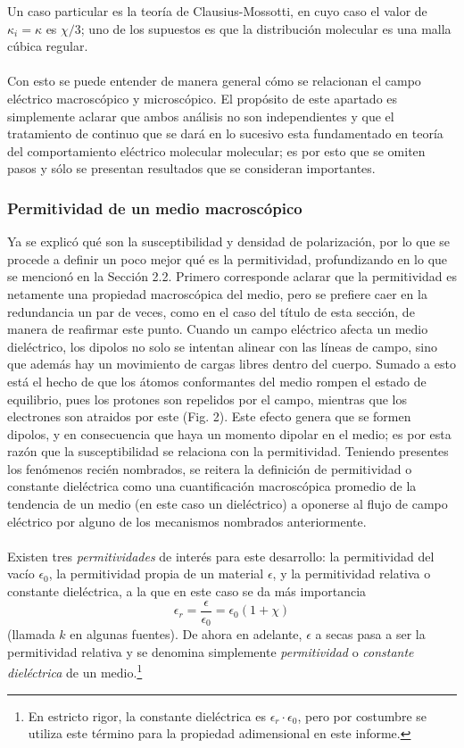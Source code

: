 \documentclass[12pt, notitlepage]{article}
\begin{document}
Un caso particular es la teoría de Clausius-Mossotti, en cuyo caso el valor de $\kappa_i = \kappa$ es $\chi/3$; uno de los supuestos es que la distribución molecular es una malla cúbica regular.\\\\
Con esto se puede entender de manera general cómo se relacionan el campo eléctrico macroscópico y microscópico. El propósito de este apartado es simplemente aclarar que ambos análisis no son independientes y que el tratamiento de continuo que se dará en lo sucesivo esta fundamentado en teoría del comportamiento eléctrico molecular molecular; es por esto que se omiten pasos y sólo se presentan resultados que se consideran importantes.

\subsubsection{Permitividad de un medio macroscópico}
Ya se explicó qué son la susceptibilidad y densidad de polarización, por lo que se procede a definir un poco mejor qué es la permitividad, profundizando en lo que se mencionó en la Sección 2.2.
Primero corresponde aclarar que la permitividad es netamente una propiedad macroscópica del medio, pero se prefiere caer en la redundancia un par de veces, como en el caso del título de esta sección, de manera de reafirmar este punto. Cuando un campo eléctrico afecta un medio dieléctrico, los dipolos no solo se intentan alinear con las líneas de campo, sino que además hay un movimiento de cargas libres dentro del cuerpo. Sumado a esto está el hecho de que los átomos conformantes del medio rompen el estado de equilibrio, pues los protones son repelidos por el campo, mientras que los electrones son atraidos por este (Fig. 2). Este efecto genera que se formen dipolos, y en consecuencia que haya un momento dipolar en el medio; es por esta razón que la susceptibilidad se relaciona con la permitividad. Teniendo presentes los fenómenos recién nombrados, se reitera la definición de permitividad o constante dieléctrica como una cuantificación macroscópica promedio de la tendencia de un medio (en este caso un dieléctrico) a oponerse al flujo de campo eléctrico por alguno de los mecanismos nombrados anteriormente.\\\\
Existen tres \textit{permitividades} de interés para este desarrollo: la permitividad del vacío $\epsilon_0$, la permitividad propia de un material $\epsilon$, y la permitividad relativa o constante dieléctrica, a la que en este caso se da más importancia
\begin{equation}
\epsilon_r = \frac{\epsilon}{\epsilon_0}=\epsilon_0(1+\chi)
\end{equation}
(llamada $k$ en algunas fuentes). De ahora en adelante, $\epsilon$ a secas pasa a ser la permitividad relativa y se denomina simplemente \textit{permitividad} o \textit{constante dieléctrica} de un medio.\footnote{En estricto rigor, la constante dieléctrica es $\epsilon_r\cdot\epsilon_0$, pero por costumbre se utiliza este término para la propiedad adimensional en este informe.}
\end{document}
